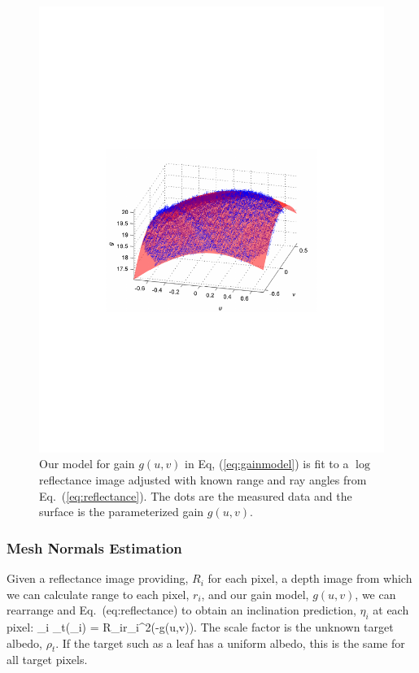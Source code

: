 \begin{figure}
\begin{center}
   \includegraphics[trim=100 250 100 250,clip,width=0.95\linewidth]{Figures/gain}
\end{center}
   \caption{Our model for gain $g(u,v)$ in Eq, (\ref{eq:gainmodel}) is fit to a $\log$ reflectance image adjusted with known range and ray angles from Eq.~(\ref{eq:reflectance}).  The dots are the measured data and the surface is the parameterized gain $g(u,v)$. }
\label{fig:gain}
\end{figure}


\subsubsection{Mesh Normals Estimation}

Given a reflectance image providing, $R_i$ for each pixel, a depth image from which we can calculate range to each pixel, $r_i$, and our gain model, $g(u,v)$, we can rearrange and Eq.~({eq:reflectance}) to obtain an inclination prediction, $\eta_i$ at each pixel:
\beq
\eta_i \equiv \rho_t\cos(\theta_i) = R_ir_i^2\exp(-g(u,v)). \label{eq:costheta}
\eeq
The scale factor is the unknown target albedo, $\rho_t$.  If the target such as a leaf has a uniform albedo, this is the same for all target pixels.  

